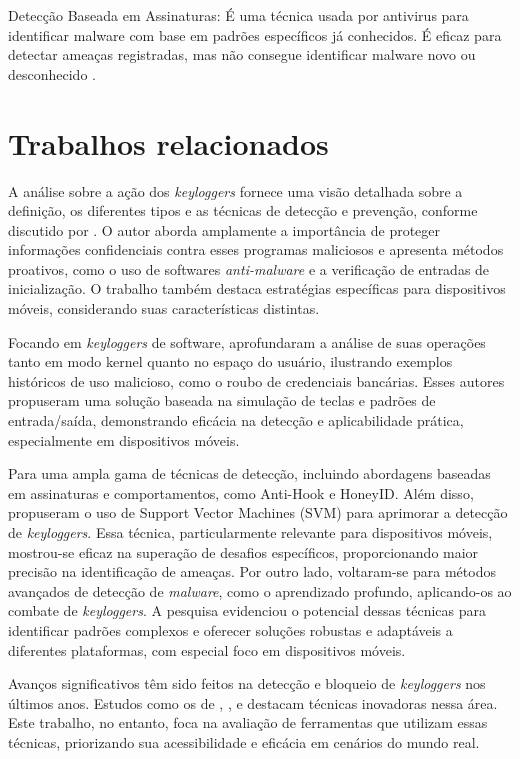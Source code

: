 \documentclass[12pt]{article}
\begin{document}
Detecção Baseada em Assinaturas: É uma técnica usada por antivirus para identificar malware com base em padrões específicos já conhecidos. É eficaz para detectar ameaças registradas, mas não consegue identificar malware novo ou desconhecido \citep{aslan2020comprehensive}.

\section{Trabalhos relacionados}

A análise sobre a ação dos \textit{keyloggers} fornece uma visão detalhada sobre a definição, os diferentes tipos e as técnicas de detecção e prevenção, conforme discutido por \citep{singh2021keylogger}. O autor aborda amplamente a importância de proteger informações confidenciais contra esses programas maliciosos e apresenta métodos proativos, como o uso de softwares \textit{anti-malware} e a verificação de entradas de inicialização. O trabalho também destaca estratégias específicas para dispositivos móveis, considerando suas características distintas.

Focando em \textit{keyloggers} de software, \citep{wajahat2019novel} aprofundaram a análise de suas operações tanto em modo kernel quanto no espaço do usuário, ilustrando exemplos históricos de uso malicioso, como o roubo de credenciais bancárias. Esses autores propuseram uma solução baseada na simulação de teclas e padrões de entrada/saída, demonstrando eficácia na detecção e aplicabilidade prática, especialmente em dispositivos móveis.

Para \citep{solairaj2016keyloggers} uma ampla gama de técnicas de detecção, incluindo abordagens baseadas em assinaturas e comportamentos, como Anti-Hook e HoneyID. Além disso, propuseram o uso de Support Vector Machines (SVM) para aprimorar a detecção de \textit{keyloggers}. Essa técnica, particularmente relevante para dispositivos móveis, mostrou-se eficaz na superação de desafios específicos, proporcionando maior precisão na identificação de ameaças. Por outro lado, \citep{aslan2020comprehensive} voltaram-se para métodos avançados de detecção de \textit{malware}, como o aprendizado profundo, aplicando-os ao combate de \textit{keyloggers}. A pesquisa evidenciou o potencial dessas técnicas para identificar padrões complexos e oferecer soluções robustas e adaptáveis a diferentes plataformas, com especial foco em dispositivos móveis.

Avanços significativos têm sido feitos na detecção e bloqueio de \textit{keyloggers} nos últimos anos. Estudos como os de \citep{singh2021keylogger}, \citep{wajahat2019novel}, \citep{solairaj2016keyloggers} e \citep{aslan2020comprehensive} destacam técnicas inovadoras nessa área. Este trabalho, no entanto, foca na avaliação de ferramentas que utilizam essas técnicas, priorizando sua acessibilidade e eficácia em cenários do mundo real.
\end{document}
